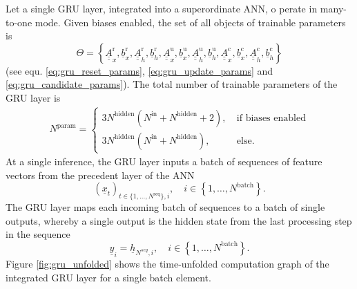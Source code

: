 Let a single GRU layer, integrated into a superordinate ANN, o
perate in many-to-one mode. 
Given biases enabled, the set of all objects of trainable parameters is
\begin{equation} \label{eq:gru_params}
    \Theta 
    = 
    \left\{  
        \underline{\underline A}^\text{r}_{x},
        \underline{b}^\text{r}_{x},
        \underline{\underline A}^\text{r}_{h},
        \underline{b}^\text{r}_{h},
        \underline{\underline A}^\text{u}_{x},
        \underline{b}^\text{u}_{x},
        \underline{\underline A}^\text{u}_{h},
        \underline{b}^\text{u}_{h},
        \underline{\underline A}^\text{c}_{x},
        \underline{b}^\text{c}_{x},
        \underline{\underline A}^\text{c}_{h},
        \underline{b}^\text{c}_{h}
    \right\}
\end{equation}
(see equ. \ref{eq:gru_reset_params},
\ref{eq:gru_update_params} 
and \ref{eq:gru_candidate_params}).
The total number of trainable parameters of the GRU layer is
\begin{align} \label{eq:gru_layer_nparams}
    N^\text{param} 
    = 
    \begin{cases}
        3 N^\text{hidden} \left(
            N^\text{in}
            + N^\text{hidden}
            + 2
        \right)
        ,\ 
        & \text{if biases enabled} \\
        3 N^\text{hidden} \left(
            N^\text{in}
            + N^\text{hidden}
        \right)
        ,\ 
        & \text{else}.
    \end{cases}
\end{align}
At a single inference, the GRU layer inputs a 
batch of sequences of feature vectors from the precedent layer of the ANN
\begin{equation}
    \left(\underline x_t\right)_{t\in\{1,\dots,N^\text{seq}\},i}
    , \quad i \in \left\{1,\dots,N^\text{batch}\right\}.
\end{equation}
The GRU layer maps each incoming batch of sequences 
to a batch of single outputs, 
whereby a single output is the hidden state 
from the last processing step in the sequence
\begin{equation} \label{equ:gru_output_many_to_one}
    \underline y_i = \underline h_{N^{seq}, i},
    \quad i \in \left\{1,\dots,N^\text{batch}\right\}.
\end{equation}
Figure \ref{fig:gru_unfolded} shows the time-unfolded computation graph 
of the integrated GRU layer for a single batch element.

